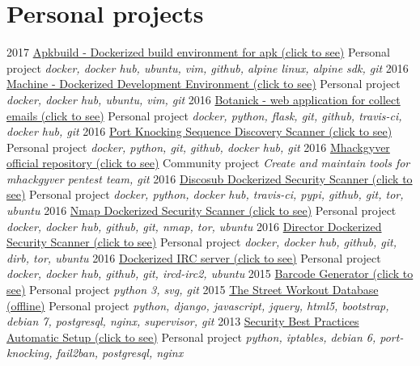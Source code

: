 \documentclass[]{friggeri-cv}
\begin{document}
\section{Personal projects}
\begin{entrylist}
    \entry
        {2017}
        {\href{https://github.com/gr0und-s3ct0r/apkbuild}{Apkbuild - Dockerized build environment for apk (click to see)}}
        {Personal project}
        {\emph{docker, docker hub, ubuntu, vim, github, alpine linux, alpine sdk, git}}
    \entry
        {2016}
        {\href{https://github.com/4383/machine}{Machine - Dockerized Development Environment (click to see)}}
        {Personal project}
        {\emph{docker, docker hub, ubuntu, vim, git}}
    \entry
        {2016}
        {\href{https://github.com/4383/Botanick}{Botanick - web application for collect emails (click to see)}}
        {Personal project}
        {\emph{docker, python, flask, git, github, travis-ci, docker hub, git}}
    \entry
        {2016}
        {\href{https://github.com/mhackgyver-squad/porno-king}{Port Knocking Sequence Discovery Scanner (click to see)}}
        {Personal project}
        {\emph{docker, python, git, github, docker hub, git}}
    \entry
        {2016}
        {\href{https://github.com/mhackgyver-squad/mhackgyver}{Mhackgyver official repository (click to see)}}
        {Community project}
        {\emph{Create and maintain tools for mhackgyver pentest team, git}}
    \entry
        {2016}
        {\href{https://hub.docker.com/r/4383/discosub}{Discosub Dockerized Security Scanner (click to see)}}
        {Personal project}
        {\emph{docker, python, docker hub, travis-ci, pypi, github, git, tor, ubuntu}}
    \entry
        {2016}
        {\href{https://hub.docker.com/r/4383/system-service-footprint}{Nmap Dockerized Security Scanner (click to see)}}
        {Personal project}
        {\emph{docker, docker hub, github, git, nmap, tor, ubuntu}}
    \entry
        {2016}
        {\href{https://hub.docker.com/r/4383/director}{Director Dockerized Security Scanner (click to see)}}
        {Personal project}
        {\emph{docker, docker hub, github, git, dirb, tor, ubuntu}}
    \entry
        {2016}
        {\href{https://hub.docker.com/r/4383/irc-server}{Dockerized IRC server (click to see)}}
        {Personal project}
        {\emph{docker, docker hub, github, git, ircd-irc2, ubuntu}}
    \entry
        {2015}
        {\href{http://pypi.python.org/pypi/barcode-generator/0.1rc15}{Barcode Generator (click to see)}}
        {Personal project}
        {\emph{python 3, svg, git}}
    \entry
        {2015}
        {\href{https://github.com/4383/street-workout-database}{The Street Workout Database (offline)}}
        {Personal project}
        {\emph{python, django, javascript, jquery, html5, bootstrap, debian 7, postgresql, nginx, supervisor, git}}
    \entry
        {2013}
        {\href{https://github.com/4383/fabric-debian/}{Security Best Practices Automatic Setup (click to see)}}
        {Personal project}
        {\emph{python, iptables,  debian 6, port-knocking, fail2ban, postgresql, nginx}}
\end{entrylist}
\end{document}
